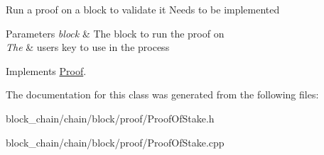 Run a proof on a block to validate it Needs to be implemented


\begin{DoxyParams}{Parameters}
{\em block} & The block to run the proof on \\
\hline
{\em The} & user\textquotesingle{}s key to use in the process \\
\hline
\end{DoxyParams}


Implements \mbox{\hyperlink{classProof_a8a43fcb7c997da54d627e0f257adb86f}{Proof}}.



The documentation for this class was generated from the following files\+:\begin{DoxyCompactItemize}
\item 
block\+\_\+chain/chain/block/proof/Proof\+Of\+Stake.\+h\item 
block\+\_\+chain/chain/block/proof/Proof\+Of\+Stake.\+cpp\end{DoxyCompactItemize}
